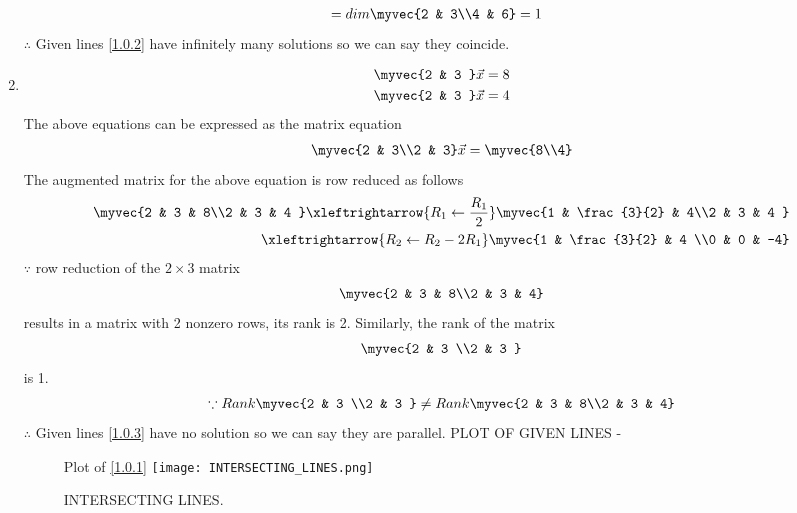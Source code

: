 \documentclass[journal,12pt,twocolumn]{IEEEtran}
\begin{document}
\begin{enumerate}
\begin{align}
&= dim\myvec{2 & 3\\4 & 6}=1
\end{align}
$\therefore$ Given lines \eqref{1.0.2} have infinitely many solutions so we can say they coincide.
\item
\begin{align}
\begin{split}
\myvec{2 & 3 }\vec{x}&=8
\\
\myvec{2 & 3 }\vec{x}&=4
\end{split}
\end{align}
The above equations can be expressed as the matrix equation
\begin{align}
\myvec{2 & 3\\2 & 3} \vec{x} = \myvec{8\\4}
\end{align}
%
The augmented matrix for the above equation is row reduced as follows
\begin{align}
\myvec{2 & 3 & 8\\2 & 3 & 4 } 
\xleftrightarrow {R_1\leftarrow \frac{R_1}{2}}\myvec{1 & \frac{3}{2} & 4\\2 & 3 & 4 }
\\
\xleftrightarrow {R_2\leftarrow R_2-2R_1}\myvec{1 & \frac{3}{2} & 4 \\0 & 0 & -4}
\\
\end{align}
%
$\because$ row reduction of the $2\times 3$ matrix
%
\begin{align}
\myvec{2 & 3 & 8\\2 & 3 & 4}
\end{align}
%
results in a matrix with 2 nonzero rows, its rank is 2. 
%
Similarly, the rank of the matrix 
\begin{align}
\myvec{2 & 3 \\2 & 3 } 
\end{align}
%
is 1.
%
\begin{align}
\because Rank \myvec{2 & 3 \\2 & 3 } \ne Rank \myvec{2 & 3 & 8\\2 & 3 & 4}
\end{align}
$\therefore$ Given lines \eqref{1.0.3} have no solution so we can say they are parallel.
PLOT OF GIVEN LINES -
\begin{figure}[H]
Plot of \eqref{1.0.1}
    \centering
    \texttt{[image: INTERSECTING\_LINES.png]}
    \caption{INTERSECTING LINES.}

\end{figure}
\end{enumerate}
\end{document}
